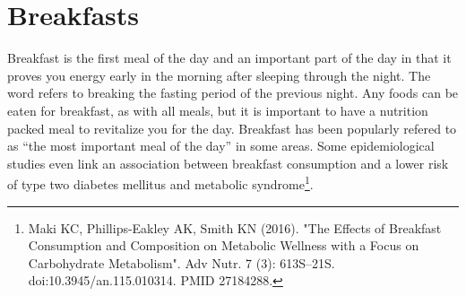 \AddToShipoutPicture*{\driedfruit}
\chapter{Breakfasts}

Breakfast is the first meal of the day and an important part of the day in that it proves you energy early in the morning after sleeping through the night. The word refers to breaking the fasting period of the previous night. Any foods can be eaten for breakfast, as with all meals, but it is important to have a nutrition packed meal to revitalize you for the day. Breakfast has been popularly refered to as ``the most important meal of the day'' in some areas. Some epidemiological studies even link an association between breakfast consumption and a lower risk of type two diabetes mellitus and metabolic syndrome\footnote{Maki KC, Phillips-Eakley AK, Smith KN (2016). "The Effects of Breakfast Consumption and Composition on Metabolic Wellness with a Focus on Carbohydrate Metabolism". Adv Nutr. 7 (3): 613S–21S. doi:10.3945/an.115.010314. PMID 27184288.}.